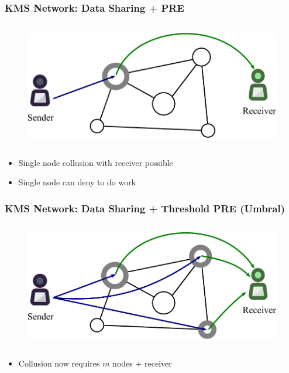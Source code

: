 \documentclass[xetex,mathsans,sans,aspectratio=169]{beamer}
\begin{document}
    \begin{frame}
        \frametitle{KMS Network: Data Sharing + PRE}
        \begin{figure}
            \centering
            \includegraphics[height=5.5cm]{pdf/prenodes.pdf}
        \end{figure}
        \begin{itemize}
            \item Single node collusion with receiver possible
            \item Single node can deny to do work
        \end{itemize}
    \end{frame}

    \begin{frame}
        \frametitle{KMS Network: Data Sharing + Threshold PRE (Umbral)}
        \begin{figure}
            \centering
            \includegraphics[height=5.5cm]{pdf/umbralnodes.pdf}
        \end{figure}
        \begin{itemize}
            \item Collusion now requires $m$ nodes + receiver
        \end{itemize}
    \end{frame}
\end{document}
